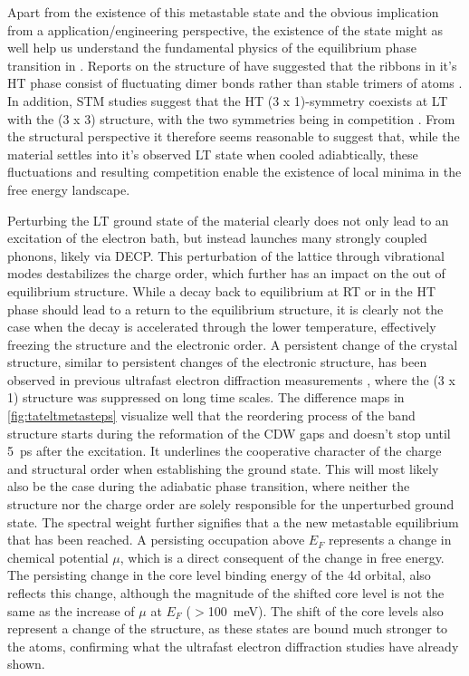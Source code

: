 Apart from the existence of this metastable state and the obvious implication from a application/engineering perspective, the existence of the state might as well help us understand the fundamental physics of the equilibrium phase transition in .
Reports on the structure of  have suggested that the ribbons in it's HT phase consist of fluctuating dimer bonds rather than stable trimers of  atoms \cite{katayama_observation_2023}.
In addition, STM studies suggest that the HT (3 x 1)-symmetry coexists at LT with the (3 x 3) structure, with the two symmetries being in competition \cite{feng_charge_2016}.
From the structural perspective it therefore seems reasonable to suggest that, while the material settles into it's observed LT state when cooled adiabtically, these fluctuations and resulting competition enable the existence of local minima in the free energy landscape.

Perturbing the LT ground state of the material clearly does not only lead to an excitation of the electron bath, but instead launches many strongly coupled phonons, likely via DECP.
This perturbation of the lattice through vibrational modes destabilizes the charge order, which further has an impact on the out of equilibrium structure.
While a decay back to equilibrium at RT or in the HT phase should lead to a return to the equilibrium structure, it is clearly not the case when the decay is accelerated through the lower temperature, effectively freezing the structure and the electronic order.
A persistent change of the crystal structure, similar to persistent changes of the electronic structure, has been observed in previous ultrafast electron diffraction measurements \cite{siddiqui_ultrafast_2021, domrose_femtosecond_2024}, where the (3 x 1) structure was suppressed on long time scales.
The difference maps in \ref{fig:tateltmetasteps} visualize well that the reordering process of the band structure starts during the reformation of the CDW gaps and doesn't stop until \qty{5}{\pico\second} after the excitation.
It underlines the cooperative character of the charge and structural order when establishing the ground state.
This will most likely also be the case during the adiabatic phase transition, where neither the structure nor the charge order are solely responsible for the unperturbed ground state.
The spectral weight further signifies that a the new metastable equilibrium that has been reached.
A persisting occupation above $E_F$ represents a change in chemical potential $\mu$, which is a direct consequent of the change in free energy.
The persisting change in the core level binding energy of the  4d orbital, also reflects this change, although the magnitude of the shifted core level is not the same as the increase of $\mu$ at $E_F$ ($>$\qty{100}{\milli\electronvolt}).
The shift of the core levels also represent a change of the structure, as these states are bound much stronger to the  atoms, confirming what the ultrafast electron diffraction studies have already shown.


